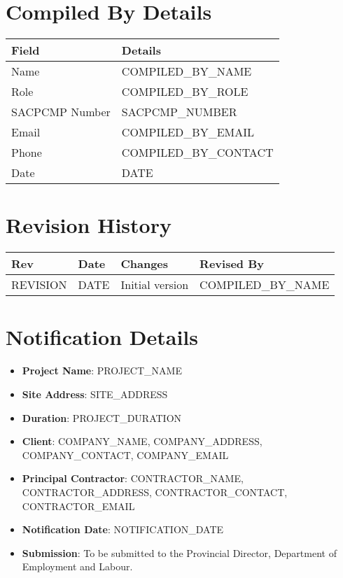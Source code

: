 \documentclass[11pt]{article}
\newcommand{\issueDate}{{{DATE}}}
\newcommand{\projectName}{{{PROJECT_NAME}}}
\newcommand{\siteAddress}{{{SITE_ADDRESS}}}
\newcommand{\projectDuration}{{{PROJECT_DURATION}}}
\newcommand{\clientName}{{{COMPANY_NAME}}}
\newcommand{\clientAddress}{{{COMPANY_ADDRESS}}}
\newcommand{\clientContact}{{{COMPANY_CONTACT}}, {{COMPANY_EMAIL}}}
\newcommand{\contractorName}{{{CONTRACTOR_NAME}}}
\newcommand{\contractorAddress}{{{CONTRACTOR_ADDRESS}}}
\newcommand{\contractorContact}{{{CONTRACTOR_CONTACT}}, {{CONTRACTOR_EMAIL}}}
\newcommand{\compilerName}{{{COMPILED_BY_NAME}}}
\newcommand{\compilerRole}{{{COMPILED_BY_ROLE}}}
\newcommand{\compilerSACPCMP}{{{SACPCMP_NUMBER}}}
\newcommand{\compilerEmail}{{{COMPILED_BY_EMAIL}}}
\newcommand{\compilerPhone}{{{COMPILED_BY_CONTACT}}}
\newcommand{\revision}{{{REVISION}}}
\newcommand{\notificationDate}{{{NOTIFICATION_DATE}}}
\begin{document}
\section{Compiled By Details}
\begin{tabularx}{\textwidth}{lX}
  \toprule
  \textbf{Field} & \textbf{Details} \\
  \midrule
  Name & \compilerName \\
  Role & \compilerRole \\
  SACPCMP Number & \compilerSACPCMP \\
  Email & \compilerEmail \\
  Phone & \compilerPhone \\
  Date & \issueDate \\
  \bottomrule
\end{tabularx}

\section{Revision History}
\begin{tabularx}{\textwidth}{lXll}
  \toprule
  \textbf{Rev} & \textbf{Date} & \textbf{Changes} & \textbf{Revised By} \\
  \midrule
  \revision & \issueDate & Initial version & \compilerName \\
  \bottomrule
\end{tabularx}

\section{Notification Details}
\begin{itemize}
    \item \textbf{Project Name}: \projectName
    \item \textbf{Site Address}: \siteAddress
    \item \textbf{Duration}: \projectDuration
    \item \textbf{Client}: \clientName, \clientAddress, \clientContact
    \item \textbf{Principal Contractor}: \contractorName, \contractorAddress, \contractorContact
    \item \textbf{Notification Date}: \notificationDate
    \item \textbf{Submission}: To be submitted to the Provincial Director, Department of Employment and Labour.
\end{itemize}
\end{document}
